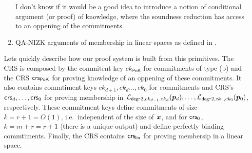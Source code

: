 \begin{enumerate}
{\color{red} I don't know if it would be a good idea to introduce a notion of conditional argument (or proof) of knowledge, where the soundness reduction has access to an oppening of the commitments.}
\item QA-NIZK arguments of membership in linear spaces as defined in \cite{EC:KilWee15}.
\end{enumerate}

Lets quickly describe how our proof system is built from this primitives. The CRS is composed by the commitent key $ck_\mathsf{PoK}$ for commitments of type (b) and the CRS $\mathsf{crs}_\mathsf{PoK}$ for proving knowledge of an oppening of these commitments. It also contains commtiment keys $ck_{d+1},ck_d\ldots,ck_0$ for commitments and CRS's $\mathsf{crs}_d,\ldots,\mathsf{crs}_0$ for proving membership in $\mathcal{L}_{\mathsf{deg}\mbox{-}2,ck_{d-1},ck_d}({\boldsymbol{p}}_d),\allowbreak\ldots,\allowbreak\mathcal{L}_{\mathsf{deg}\mbox{-}2,ck_1,ck_0}({\boldsymbol{p}}_0)$, respectively. These commitment keys define commitments of size $k=r+1=O(1)$, i.e.~independent of the size of ${\boldsymbol{x}}$, and for $\mathsf{crs}_0$, $k=m+r=r+1$ (there is a unique output) and define perfectly binding commtiments. Finally, the CRS contains $\mathsf{crs}_\mathsf{lin}$ for proving membersip in a linear space.

